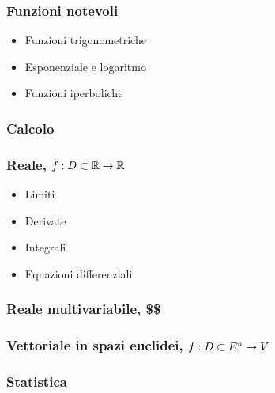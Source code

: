 \documentclass[letterpaper,10pt,english]{jupyterBook}
\begin{document}
\subsubsection*{Funzioni notevoli}
\begin{itemize}
\item {} 
\sphinxAtStartPar
Funzioni trigonometriche

\item {} 
\sphinxAtStartPar
Esponenziale e logaritmo

\item {} 
\sphinxAtStartPar
Funzioni iperboliche

\end{itemize}
\subsubsection*{Calcolo}


\subsubsection*{Reale, \protect\( f: D \subset \mathbb{R} \rightarrow \mathbb{R}\protect\)}
\begin{itemize}
\item {} 
\sphinxAtStartPar
Limiti

\item {} 
\sphinxAtStartPar
Derivate

\item {} 
\sphinxAtStartPar
Integrali

\item {} 
\sphinxAtStartPar
Equazioni differenziali

\end{itemize}
\subsubsection*{Reale multi\sphinxhyphen{}variabile, \$\$}
\subsubsection*{Vettoriale in spazi euclidei, \protect\( f: D \subset E^n \rightarrow V\protect\)}
\subsubsection*{Statistica}
\end{document}
